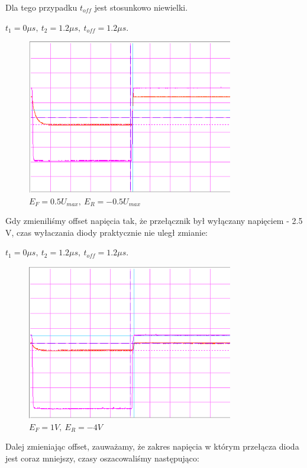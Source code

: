 \documentclass[a4paper,11pt]{article}
\begin{document}
Dla tego przypadku \( t_{off} \) jest stosunkowo niewielki.

\(t_1 = 0 \mu s,\ t_2 = 1.2 \mu s,\ t_{off} = 1.2 \mu s \).

\begin{figure} [H]
  \begin{center}
    \includegraphics[width = 9cm]{../Obrazki_i_tekst/obrobione/31bsciety.png}
    \caption{\( E_F = 0.5 U_{max}, \ E_R = -0.5 U_{max}\)}
  \end{center}
\end{figure}

Gdy zmieniliśmy offset napięcia tak, że przełącznik był wyłączany napięciem - 2.5 V, czas wyłaczania diody praktycznie nie uległ zmianie:

\(t_1 = 0 \mu s,\ t_2 = 1.2 \mu s,\ t_{off} = 1.2 \mu s \).

\begin{figure} [H]
  \begin{center}
    \includegraphics[width = 9cm]{../Obrazki_i_tekst/obrobione/31csciety.png}
    \caption{\( E_F = 1V, \ E_R = -4 V\)}
  \end{center}
\end{figure}

Dalej zmieniając offset, zauważamy, że zakres napięcia w którym przełącza dioda jest coraz mniejszy, czasy oszacowaliśmy następująco:
\end{document}
